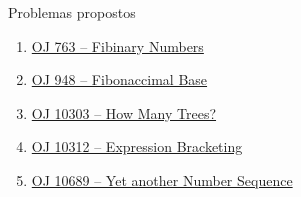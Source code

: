\begin{frame}[fragile]{Problemas propostos}

    \begin{enumerate}
        \item \href{https://onlinejudge.org/index.php?option=com_onlinejudge&Itemid=8&category=24&page=show_problem&problem=704}{OJ 763 -- Fibinary Numbers}
        \item \href{https://onlinejudge.org/index.php?option=com_onlinejudge&Itemid=8&category=24&page=show_problem&problem=889}{OJ 948 -- Fibonaccimal Base}
        \item \href{ https://onlinejudge.org/index.php?option=com_onlinejudge&Itemid=8&category=24&page=show_problem&problem=1244}{OJ 10303 -- How Many Trees?}
        \item \href{https://onlinejudge.org/index.php?option=com_onlinejudge&Itemid=8&category=24&page=show_problem&problem=1253}{OJ 10312 -- Expression Bracketing}
        \item \href{https://onlinejudge.org/index.php?option=com_onlinejudge&Itemid=8&category=24&page=show_problem&problem=1630}{OJ 10689 -- Yet another Number Sequence}
    \end{enumerate}

\end{frame}
